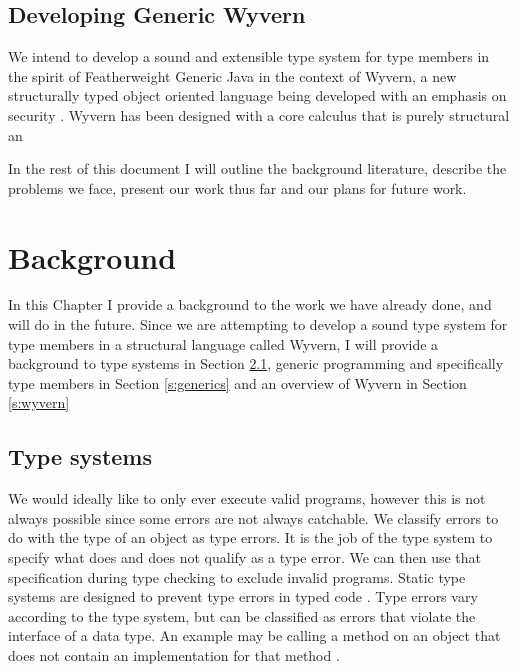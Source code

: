 \documentclass[11pt
              , a4paper
              , twoside
              , openright
              ]{report}
\numberwithin{case}{theorem}
\numberwithin{subcase}{case}
\begin{document}
\section{Developing Generic Wyvern}

We intend to develop a sound and extensible type system for type members in the spirit of Featherweight Generic Java \cite{Igarashi:2001:FJM:503502.503505} in the context of Wyvern, a new structurally typed object oriented language being developed with an emphasis on security \cite{Omar2014}. Wyvern has been designed with a core calculus that is purely structural an

In the rest of this document I will outline the background literature, describe the problems we face, present our work thus far and our plans for future work.

\chapter{Background}\label{ch:background}

In this Chapter I provide a background to the work we have already done, and will do in the future. Since we are attempting to develop a sound type system for type members in a structural language called Wyvern, I will provide a background to type systems in Section \ref{s:typesys}, generic programming and specifically type members in Section \ref{s:generics} and an overview of Wyvern in Section \ref{s:wyvern}

\section{Type systems}\label{s:typesys}
We would ideally like to only ever execute valid programs, however this is not always possible since some errors are not always catchable. We classify errors to do with the type of an object as type errors. It is the job of the type system to specify what does and does not qualify as a type error. We can then use that specification during type checking to exclude invalid programs. Static type systems are designed to prevent type errors in typed code \cite{Wright:1994:SAT:191905.191909}. Type errors vary according to the type system, but can be classified as errors that violate the interface of a data type. An example may be calling a method on an object that does not contain an implementation for that method \cite{Wright:1994:SAT:191905.191909}.
\end{document}
